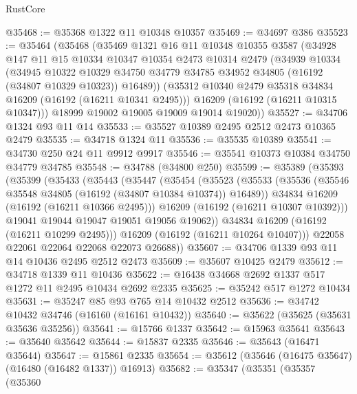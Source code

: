 \begin{lexlean}{RustCore}
\begin{coremodule}
@35468 := @35368 @1322 @11 @10348 @10357
@35469 := @34697 @386
@35523 := @35464
    (@35468
      (@35469
        @1321
        @16
        @11
        @10348
        @10355
        @3587
        (@34928
          @147
          @11
          @15
          @10334
          @10347
          @10354
          @2473
          @10314
          @2479
          (@34939
            @10334
            (@34945
              @10322
              @10329
              @34750
              @34779
              @34785
              @34952
              @34805
              (@16192 (@34807 @10329 @10323))
              @16489))
          (@35312 @10340 @2479 @35318 @34834 @16209 (@16192 (@16211 @10341 @2495)))
          @16209
          (@16192 (@16211 @10315 @10347)))
        @18999
        @19002
        @19005
        @19009
        @19014
        @19020))
@35527 := @34706 @1324 @93 @11 @14
@35533 := @35527 @10389 @2495 @2512 @2473 @10365 @2479
@35535 := @34718 @1324 @11
@35536 := @35535 @10389
@35541 := @34730 @250 @24 @11 @9912 @9917
@35546 := @35541 @10373 @10384 @34750 @34779 @34785
@35548 := @34788 (@34800 @250)
@35599 := @35389
    (@35393
      (@35399
        (@35433
          (@35443
            (@35447
              (@35454
                (@35523
                  (@35533
                    (@35536 (@35546 @35548 @34805 (@16192 (@34807 @10384 @10374)) @16489))
                    @34834
                    @16209
                    (@16192 (@16211 @10366 @2495)))
                  @16209
                  (@16192 (@16211 @10307 @10392)))
                @19041
                @19044
                @19047
                @19051
                @19056
                @19062))
            @34834
            @16209
            (@16192 (@16211 @10299 @2495)))
          @16209
          (@16192 (@16211 @10264 @10407)))
        @22058
        @22061
        @22064
        @22068
        @22073
        @26688))
@35607 := @34706 @1339 @93 @11 @14 @10436 @2495 @2512 @2473
@35609 := @35607 @10425 @2479
@35612 := @34718 @1339 @11 @10436
@35622 := @16438 @34668 @2692 @1337 @517 @1272 @11 @2495 @10434 @2692 @2335
@35625 := @35242 @517 @1272 @10434
@35631 := @35247 @85 @93 @765 @14 @10432 @2512
@35636 := @34742 @10432 @34746 (@16160 (@16161 @10432))
@35640 := @35622 (@35625 (@35631 @35636 @35256))
@35641 := @15766 @1337
@35642 := @15963 @35641
@35643 := @35640 @35642
@35644 := @15837 @2335
@35646 := @35643 (@16471 @35644)
@35647 := @15861 @2335
@35654 := @35612 (@35646 (@16475 @35647) (@16480 (@16482 @1337)) @16913)
@35682 := @35347
    (@35351
      (@35357
        (@35360

\end{coremodule}
\end{lexlean}
